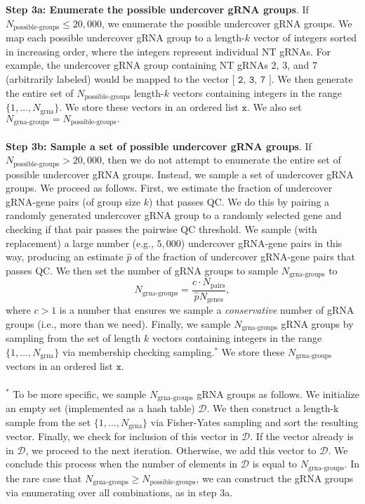\documentclass[12pt]{article}
\begin{document}
\\ \\
\textbf{Step 3a: Enumerate the possible undercover gRNA groups}. If $N_\textrm{possible-groups} \leq 20,000$, we enumerate the possible undercover gRNA groups. We map each possible undercover gRNA group to a length-$k$ vector of integers sorted in increasing order, where the integers represent individual NT gRNAs. For example, the undercover gRNA group containing NT gRNAs 2, 3, and 7 (arbitrarily labeled) would be mapped to the vector $\texttt{[ 2, 3, 7 ]}.$ We then generate the entire set of $N_\textrm{possible-groups}$ length-$k$ vectors containing integers in the range $\{1, \dots, N_\textrm{grna}\}$. We store these vectors in an ordered list $\texttt{x}$. We also set $N_\textrm{grna-groups} = N_\textrm{possible-groups}.$
\\ \\
\textbf{Step 3b: Sample a set of possible undercover gRNA groups}. If $N_\textrm{possible-groups} > 20,000$, then we do not attempt to enumerate the entire set of possible undercover gRNA groups. Instead, we sample a set of undercover gRNA groups. We proceed as follows. First, we estimate the fraction of undercover gRNA-gene pairs (of group size $k$) that passes QC. We do this by pairing a randomly generated undercover gRNA group to a randomly selected gene and checking if that pair passes the pairwise QC threshold. We sample (with replacement) a large number (e.g., $5,000$) undercover gRNA-gene pairs in this way, producing an estimate $\hat{p}$ of the fraction of undercover gRNA-gene pairs that passes QC. We then set the number of gRNA groups to sample $N_\textrm{grna-groups}$ to $$N_\textrm{grna-groups} = \frac{c \cdot N_\textrm{pairs} }{ \hat{p} N_\textrm{genes}},$$ where $c > 1$ is a number that ensures we sample a \textit{conservative} number of gRNA groups (i.e., more than we need). Finally, we sample $N_\textrm{grna-groups}$ gRNA groups by sampling from the set of length $k$ vectors containing integers in the range $\{1, \dots, N_\textrm{grna}\}$ via membership checking sampling.$^*$ We store these $N_\textrm{grna-groups}$ vectors in an ordered list $\texttt{x}$.
\\ \\
$^*$ To be more specific, we sample $N_\textrm{grna-groups}$ gRNA groups as follows. We initialize an empty set (implemented as a hash table) $\mathcal{D}$. We then construct a length-k sample from the set $\{1, \dots, N_\textrm{grna}\}$ via Fisher-Yates sampling and sort the resulting vector. Finally, we check for inclusion of this vector in $\mathcal{D}.$ If the vector already is in $\mathcal{D}$, we proceed to the next iteration. Otherwise, we add this vector to $\mathcal{D}$. We conclude this process when the number of elements in $\mathcal{D}$ is equal to $N_\textrm{grna-groups}.$ In the rare case that $N_\textrm{grna-groups} \geq N_\textrm{possible-groups}$, we can construct the gRNA groups via enumerating over all combinations, as in step 3a. 
\end{document}
